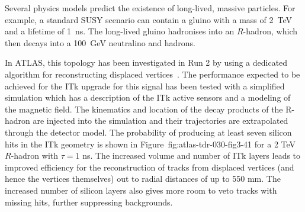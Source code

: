 Several physics models predict the existence of long-lived, massive particles. For example, a standard SUSY scenario can contain a gluino with a mass of 2~TeV and a lifetime of 1~ns. The long-lived gluino hadronises into an $R$-hadron, which then decays into a 100~GeV neutralino and hadrons.

In ATLAS, this topology has been investigated in Run 2 by using a dedicated algorithm for reconstructing displaced vertices~\cite{ATL-PHYS-PUB-2017-014}. The performance expected to be achieved for the ITk upgrade for this signal has been tested with a simplified simulation which has a description of the ITk active sensors and a modeling of the magnetic field. The kinematics and location of the decay products of the R-hadron are injected into the simulation and their trajectories are extrapolated through the detector model. The probability of producing at least seven silicon hits in the ITk geometry is shown in Figure~{fig:atlas-tdr-030-fig3-41} for a 2 TeV $R$-hadron with $\tau=1$ ns. The increased volume and number of ITk layers leads to improved efficiency for the reconstruction of tracks from displaced vertices (and hence the vertices themselves) out to radial distances of up to 550 mm. The increased number of silicon layers also gives more room to veto tracks with missing hits, further suppressing backgrounds.
%
